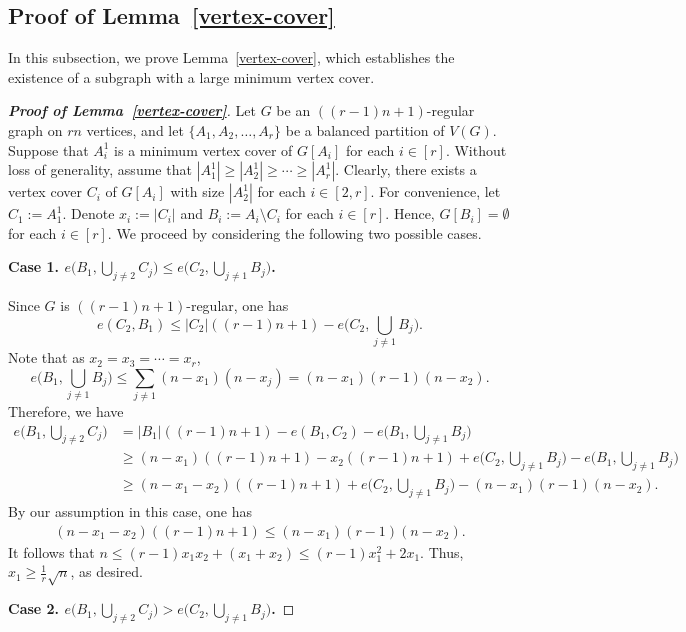 \documentclass[11pt, a4paper]{article}
\theoremstyle{definition}
\newcommand{\<}{\subseteq}
\begin{document}
\subsection{Proof of Lemma~\ref{vertex-cover}}
In this subsection, we prove Lemma~\ref{vertex-cover}, which establishes the existence of a subgraph with a large minimum vertex cover.
\begin{proof}[\bf Proof of Lemma~\ref{vertex-cover}]
Let $G$ be an $((r-1)n+1)$-regular graph on $rn$ vertices, and let $\{A_1,A_2,\ldots,A_r\}$ be a balanced partition of $V(G)$. Suppose that $A_i^1$ is a minimum vertex cover of $G[A_i]$ for each $i\in [r]$. Without loss of generality, assume that $|A_1^1|\geq |A_2^1|\geq \cdots \geq |A_r^1|$. Clearly, there exists a vertex cover $C_i$ of $G[A_i]$ with size $|A_2^1|$ for each $i\in [2,r]$. For convenience, let $C_1:=A_1^1$. Denote $x_i:=|C_i|$ and $B_i:=A_i\setminus C_i$ for each $i\in [r]$. Hence, $G[B_i]=\emptyset$ for each $i\in [r]$. We proceed by considering the following two possible cases. 

\medskip
{\bf Case 1. $e\Big(B_1,\bigcup_{j\neq 2}C_j\Big)\leq e\Big(C_2,\bigcup_{j\neq 1}B_j\Big)$.}
\medskip

Since $G$ is  $((r-1)n+1)$-regular, one has 
$$
e(C_2,B_1)\leq |C_2|((r-1)n+1)-e\Big(C_2,\bigcup_{j\neq 1}B_j\Big).
$$
Note that as $x_2=x_3=\cdots=x_r$,
$$
e\Big(B_1,\bigcup_{j\neq 1}B_j\Big)\le\sum_{j\neq1}(n-x_1)(n-x_j)=(n-x_1)(r-1)(n-x_2).
$$
Therefore, we have
\begin{align*}
e\Big(B_1,\bigcup_{j\neq 2}C_j\Big)&=|B_1|((r-1)n+1)-e(B_1,C_2)-e\Big(B_1,\bigcup_{j\neq 1}B_j\Big)\\
&\geq (n-x_1)((r-1)n+1)-x_2((r-1)n+1)+e\Big(C_2,\bigcup_{j\neq 1}B_j\Big)-e\Big(B_1,\bigcup_{j\neq 1}B_j\Big)\\
&\geq (n-x_1-x_2)((r-1)n+1)+e\Big(C_2,\bigcup_{j\neq 1}B_j\Big)-(n-x_1)(r-1)(n-x_2).
\end{align*}
By our assumption in this case, one has
\begin{align*}
(n-x_1-x_2)((r-1)n+1)\leq (n-x_1)(r-1)(n-x_2).
\end{align*}
It follows that $n\leq (r-1)x_1x_2+(x_1+x_2)\leq (r-1)x_1^2+2x_1.$ Thus, $x_1\geq \frac{1}{r}\sqrt{n}$, as desired.

\medskip
{\bf Case 2. $e\Big(B_1,\bigcup_{j\neq 2}C_j\Big)> e\Big(C_2,\bigcup_{j\neq 1}B_j\Big)$.}
\medskip


\end{proof}
\end{document}
